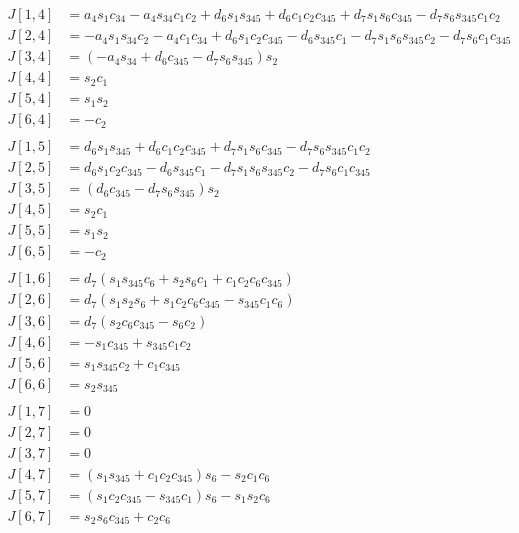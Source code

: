 \documentclass{article}
\begin{document}
\begin{align*}
J[1,4] &= a_{4} s_{1} c_{34} - a_{4} s_{34} c_{1} c_{2} + d_{6} s_{1} s_{345} + d_{6} c_{1} c_{2} c_{345} + d_{7} s_{1} s_{6} c_{345} - d_{7} s_{6} s_{345} c_{1} c_{2} \\
J[2,4] &= - a_{4} s_{1} s_{34} c_{2} - a_{4} c_{1} c_{34} + d_{6} s_{1} c_{2} c_{345} - d_{6} s_{345} c_{1} - d_{7} s_{1} s_{6} s_{345} c_{2} - d_{7} s_{6} c_{1} c_{345} \\
J[3,4] &= \left(- a_{4} s_{34} + d_{6} c_{345} - d_{7} s_{6} s_{345}\right) s_{2} \\
J[4,4] &= s_{2} c_{1} \\
J[5,4] &= s_{1} s_{2} \\
J[6,4] &= - c_{2} \\
\\
J[1,5] &= d_{6} s_{1} s_{345} + d_{6} c_{1} c_{2} c_{345} + d_{7} s_{1} s_{6} c_{345} - d_{7} s_{6} s_{345} c_{1} c_{2} \\
J[2,5] &= d_{6} s_{1} c_{2} c_{345} - d_{6} s_{345} c_{1} - d_{7} s_{1} s_{6} s_{345} c_{2} - d_{7} s_{6} c_{1} c_{345} \\
J[3,5] &= \left(d_{6} c_{345} - d_{7} s_{6} s_{345}\right) s_{2} \\
J[4,5] &= s_{2} c_{1} \\
J[5,5] &= s_{1} s_{2} \\
J[6,5] &= - c_{2} \\
\\
J[1,6] &= d_{7} \left(s_{1} s_{345} c_{6} + s_{2} s_{6} c_{1} + c_{1} c_{2} c_{6} c_{345}\right) \\
J[2,6] &= d_{7} \left(s_{1} s_{2} s_{6} + s_{1} c_{2} c_{6} c_{345} - s_{345} c_{1} c_{6}\right) \\
J[3,6] &= d_{7} \left(s_{2} c_{6} c_{345} - s_{6} c_{2}\right) \\
J[4,6] &= - s_{1} c_{345} + s_{345} c_{1} c_{2} \\
J[5,6] &= s_{1} s_{345} c_{2} + c_{1} c_{345} \\
J[6,6] &= s_{2} s_{345} \\
\\
J[1,7] &= 0 \\
J[2,7] &= 0 \\
J[3,7] &= 0 \\
J[4,7] &= \left(s_{1} s_{345} + c_{1} c_{2} c_{345}\right) s_{6} - s_{2} c_{1} c_{6} \\
J[5,7] &= \left(s_{1} c_{2} c_{345} - s_{345} c_{1}\right) s_{6} - s_{1} s_{2} c_{6} \\
J[6,7] &= s_{2} s_{6} c_{345} + c_{2} c_{6} \\
\end{align*}
\end{document}

